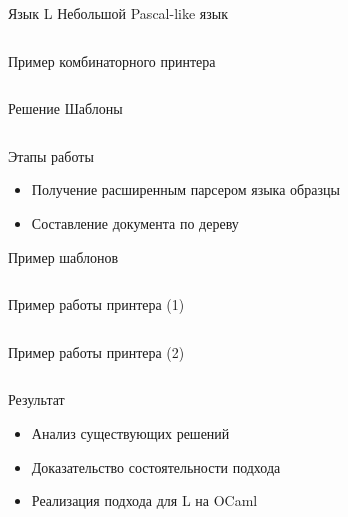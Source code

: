 \documentclass{beamer}
\begin{document}
\begin{frame}{Язык L}
	Небольшой Pascal-like язык
	\vspace{1cm}
	\begin{block}{}
		\inputminted{c}{codes/pow.l}
	\end{block}
\end{frame}

\begin{frame}{Пример комбинаторного принтера}
	\inputminted{haskell}{codes/lHughesPrinter.hs}
\end{frame}

\begin{frame}{Решение}
	Шаблоны
	\begin{block}{}
		\inputminted{pascal}{codes/l_write.t}
	\end{block}
\end{frame}

\begin{frame}{Этапы работы}
	\begin{itemize}
		\item Получение расширенным парсером языка образцы
		\item Составление документа по дереву
	\end{itemize}
\end{frame}

\begin{frame}{Пример шаблонов}
	\begin{block}{}
		\inputminted{c}{codes/l_while.t}
	\end{block}
\end{frame}

\begin{frame}{Пример работы принтера (1)}
	\begin{block}{}
		\inputminted{c}{codes/firstTemplatePow.l}
	\end{block}
\end{frame}

\begin{frame}{Пример работы принтера (2)}
	\begin{block}{}
		\inputminted{c}{codes/secondTemplatePow.l}
	\end{block}
\end{frame}


\begin{frame}{Результат}
	\begin{itemize}
		\item Анализ существующих решений
		\item Доказательство состоятельности подхода
		\item Реализация подхода для L на OCaml
	\end{itemize}
\end{frame}
\end{document}
